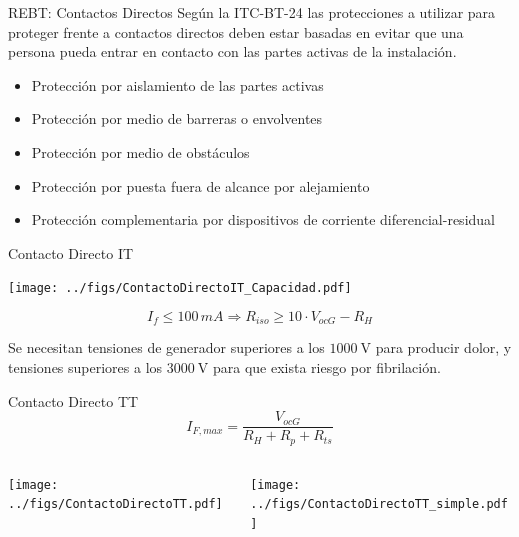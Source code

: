 \documentclass[aspectratio=169, usenames,svgnames,dvipsnames]{beamer}
\begin{document}
\begin{frame}[label={sec:org1f817dd}]{REBT: Contactos Directos}
Según la ITC-BT-24 las protecciones a utilizar para proteger frente a
contactos directos deben estar \alert{basadas en evitar que una persona pueda
entrar en contacto con las partes activas} de la instalación.

\begin{itemize}
\item Protección por \alert{aislamiento de las partes activas}

\item Protección por medio de \alert{barreras o envolventes}

\item Protección por medio de \alert{obstáculos}

\item Protección por puesta \alert{fuera de alcance} por alejamiento

\item Protección complementaria por \alert{dispositivos de corriente
diferencial}-residual
\end{itemize}
\end{frame}


\begin{frame}[label={sec:orgdc2be74}]{Contacto Directo IT}
\begin{center}
\texttt{[image: ../figs/ContactoDirectoIT\_Capacidad.pdf]}
\end{center}

$$I_{f}\leq100\, mA\Longrightarrow R_{iso}\geq10\cdot V_{ocG}-R_{H}$$

Se necesitan tensiones de generador superiores a los \(\SI{1000}{\volt}\)
para producir dolor, y tensiones superiores a los \(\SI{3000}{\volt}\)
para que exista riesgo por fibrilación.
\end{frame}

\begin{frame}[label={sec:org5922337}]{Contacto Directo TT}
$$I_{F,max}=\frac{V_{ocG}}{R_{H}+R_{p}+R_{ts}}$$

\begin{columns}
\begin{column}{0.5\columnwidth}
\begin{center}
\texttt{[image: ../figs/ContactoDirectoTT.pdf]}
\end{center}
\end{column}

\begin{column}{0.5\columnwidth}
\begin{center}
\texttt{[image: ../figs/ContactoDirectoTT\_simple.pdf]}
\end{center}
\end{column}
\end{columns}
\end{frame}
\end{document}
